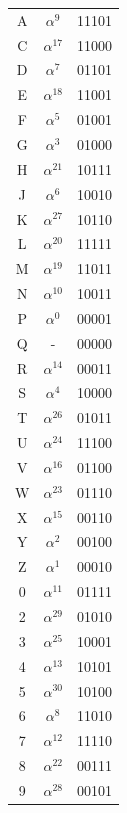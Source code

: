 \documentclass[letterpaper]{article}
\begin{document}
\begin{minipage}[b]{0.3\linewidth}
\begin{center}
\begin{tabular}{|ccc|}
\hline
A & $\alpha^9$ & 11101 \\
C & $\alpha^{17}$ & 11000 \\
D & $\alpha^7$ & 01101 \\
E & $\alpha^{18}$ & 11001 \\
F & $\alpha^5$ & 01001 \\
G & $\alpha^3$ & 01000 \\
H & $\alpha^{21}$ & 10111 \\
J & $\alpha^6$ & 10010 \\
K & $\alpha^{27}$ & 10110 \\
L & $\alpha^{20}$ & 11111 \\
M & $\alpha^{19}$ & 11011 \\
N & $\alpha^{10}$ & 10011 \\
P & $\alpha^0$ & 00001 \\
Q & - & 00000 \\
R & $\alpha^{14}$ & 00011 \\
S & $\alpha^4$ & 10000 \\
T & $\alpha^{26}$ & 01011 \\
U & $\alpha^{24}$ & 11100 \\
V & $\alpha^{16}$ & 01100 \\
W & $\alpha^{23}$ & 01110 \\
X & $\alpha^{15}$ & 00110 \\
Y & $\alpha^2$ & 00100 \\
Z & $\alpha^1$ & 00010 \\
0 & $\alpha^{11}$ & 01111 \\
2 & $\alpha^{29}$ & 01010 \\
3 & $\alpha^{25}$ & 10001 \\
4 & $\alpha^{13}$ & 10101 \\
5 & $\alpha^{30}$ & 10100 \\
6 & $\alpha^8$ & 11010 \\
7 & $\alpha^{12}$ & 11110 \\
8 & $\alpha^{22}$ & 00111 \\
9 & $\alpha^{28}$ & 00101 \\
\hline
\end{tabular}
\end{center}
\end{minipage}
\end{document}
